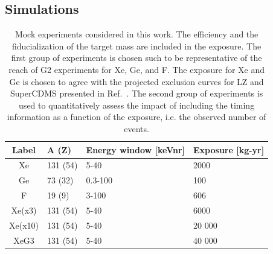\documentclass[11pt]{article}
\begin{document}
\subsection{Simulations\label{sec:sims}}

\begin{table}[tbp]
  \setlength{\extrarowheight}{3pt}
  \setlength{\tabcolsep}{10pt}
  \begin{center}
	\begin{tabular}{|c||m{2.3cm}|m{4.2cm}|m{2.8cm}|}  \hline
	Label & A (Z) & Energy window [keVnr] & Exposure [kg-yr] \\ \hline
	\hline
	Xe & 131 (54) & 5-40 & 2000 \\  \hline
	Ge & 73 (32) & 0.3-100 & 100  \\  \hline
	F &  19 (9) & 3-100 & 606 \\  \hline
	\hline
	Xe(x3) & 131 (54) & 5-40 & 6000 \\  \hline
	Xe(x10) & 131 (54) & 5-40 & 20 000 \\  \hline
	XeG3 & 131 (54) & 5-40 & 40 000 \\ \hline \hline
	\end{tabular}
  \end{center}
\caption{Mock experiments considered in this work. The efficiency and the fiducialization of the target mass are included in the exposure. The first group of experiments is chosen such to be representative of the reach of G2 experiments for Xe, Ge, and F. The exposure for Xe and Ge is chosen to agree with the projected exclusion curves for LZ and SuperCDMS presented in Ref.~\cite{Cushman:2013zza}. The second group of experiments is used to quantitatively assess the impact of including the timing information as a function of the exposure, i.e. the observed number of events. }
\label{tab:experiments}
\end{table}
\end{document}

